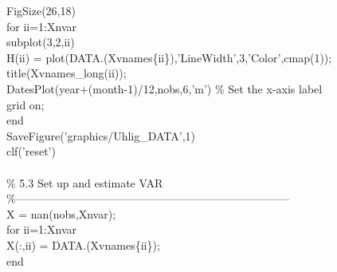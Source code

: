 \hspace{1mm}FigSize(26,18) \\ 
\hspace{1mm}\textcolor{matlabblue}{for} ii=1:Xnvar \\ 
\hspace{1mm}\hspace{5mm} subplot(3,2,ii) \\ 
\hspace{1mm}\hspace{5mm} H(ii) = plot(DATA.(Xvnames\{ii\}),\textcolor{matlabpurple}{'LineWidth'},3,\textcolor{matlabpurple}{'Color'},cmap(1)); \\ 
\hspace{1mm}\hspace{5mm} title(Xvnames\_long(ii));  \\ 
\hspace{1mm}\hspace{5mm} DatesPlot(year+(month-1)/12,nobs,6,\textcolor{matlabpurple}{'m'}) \textcolor{matlabgreen}{\% Set the x-axis label  }\\ 
\hspace{1mm}\hspace{5mm} grid on;  \\ 
\hspace{1mm}\textcolor{matlabblue}{end} \\ 
\hspace{1mm}SaveFigure(\textcolor{matlabpurple}{'graphics/Uhlig\_DATA'},1) \\ 
\hspace{1mm}clf(\textcolor{matlabpurple}{'reset'}) \\ 
\hspace{1mm} \\ 
\hspace{1mm}\textcolor{matlabgreen}{\% 5.3 Set up and estimate VAR }\\ 
\hspace{1mm}\textcolor{matlabgreen}{\%--------------------------------------------------------------------------  }\\ 
\hspace{1mm}X = nan(nobs,Xnvar); \\ 
\hspace{1mm}\textcolor{matlabblue}{for} ii=1:Xnvar \\ 
\hspace{1mm}\hspace{5mm} X(:,ii) = DATA.(Xvnames\{ii\}); \\ 
\hspace{1mm}\textcolor{matlabblue}{end} \\ 
